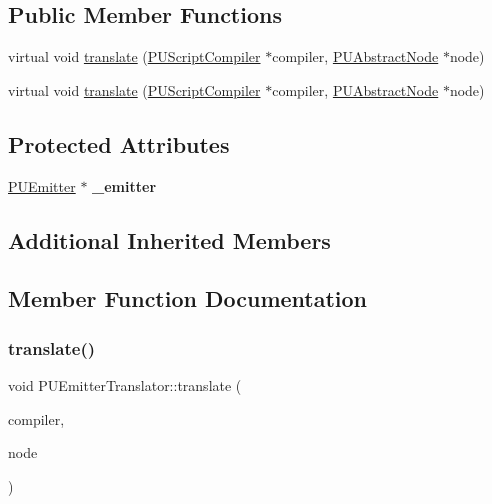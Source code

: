 \subsection*{Public Member Functions}
\begin{DoxyCompactItemize}
\item 
virtual void \hyperlink{classPUEmitterTranslator_ad6d9c8b99173c63cbdb0c7c27632581c}{translate} (\hyperlink{classPUScriptCompiler}{P\+U\+Script\+Compiler} $\ast$compiler, \hyperlink{classPUAbstractNode}{P\+U\+Abstract\+Node} $\ast$node)
\item 
virtual void \hyperlink{classPUEmitterTranslator_a18d5543718c2f2161d3924858c9430b9}{translate} (\hyperlink{classPUScriptCompiler}{P\+U\+Script\+Compiler} $\ast$compiler, \hyperlink{classPUAbstractNode}{P\+U\+Abstract\+Node} $\ast$node)
\end{DoxyCompactItemize}
\subsection*{Protected Attributes}
\begin{DoxyCompactItemize}
\item 
\mbox{\label{classPUEmitterTranslator_a20399290c4123b583bec718403437fd8}} 
\hyperlink{classPUEmitter}{P\+U\+Emitter} $\ast$ {\bfseries \+\_\+emitter}
\end{DoxyCompactItemize}
\subsection*{Additional Inherited Members}


\subsection{Member Function Documentation}
\mbox{\label{classPUEmitterTranslator_ad6d9c8b99173c63cbdb0c7c27632581c}} 
\subsubsection{\texorpdfstring{translate()}{translate()}\hspace{0.1cm}{\footnotesize\ttfamily [1/2]}}
{\footnotesize\ttfamily void P\+U\+Emitter\+Translator\+::translate (\begin{DoxyParamCaption}\item[{\hyperlink{classPUScriptCompiler}{P\+U\+Script\+Compiler} $\ast$}]{compiler,  }\item[{\hyperlink{classPUAbstractNode}{P\+U\+Abstract\+Node} $\ast$}]{node }\end{DoxyParamCaption})\hspace{0.3cm}{\ttfamily [virtual]}}

